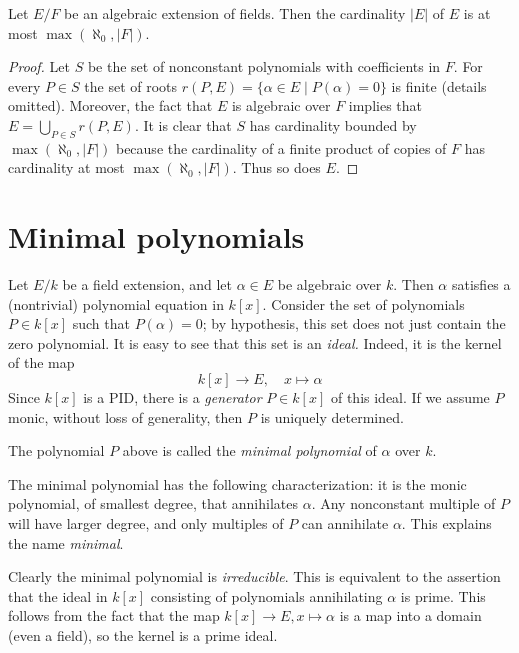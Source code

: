 \begin{lemma}
\label{lemma-size-algebraic-extension}
Let $E/F$ be an algebraic extension of fields. Then the cardinality $|E|$
of $E$ is at most $\max(\aleph_0, |F|)$.
\end{lemma}

\begin{proof}
Let $S$ be the set of nonconstant polynomials with coefficients in $F$.
For every $P \in S$ the set of roots
$r(P, E) = \{\alpha \in E \mid P(\alpha) = 0\}$
is finite (details omitted). Moreover, the fact that $E$ is algebraic
over $F$ implies that $E = \bigcup_{P \in S} r(P, E)$.
It is clear that $S$ has cardinality bounded by $\max(\aleph_0, |F|)$
because the cardinality of a finite product of copies of $F$ has
cardinality at most $\max(\aleph_0, |F|)$.
Thus so does $E$.
\end{proof}


\section{Minimal polynomials}
\label{section-minimal-polynomials}

\noindent
Let $E/k$ be a field extension, and let $\alpha \in E$ be algebraic over $k$.
Then $\alpha$ satisfies a (nontrivial) polynomial equation in $k[x]$.
Consider the set of polynomials $P \in k[x]$ such that $P(\alpha) = 0$; by
hypothesis, this set does not just contain the zero polynomial.
It is easy to see that this set is an {\it ideal.} Indeed, it is the kernel
of the map
$$
k[x] \to E, \quad x \mapsto \alpha
$$
Since $k[x]$ is a PID, there is a {\it generator} $P \in k[x]$ of this
ideal. If we assume $P$ monic, without loss of generality, then $P$ is
uniquely determined.

\begin{definition}
\label{definition-minimal-polynomial}
The polynomial $P$ above is called the {\it minimal polynomial}
of $\alpha$ over $k$.
\end{definition}

\noindent
The minimal polynomial has the following characterization: it is the monic
polynomial, of smallest degree, that annihilates $\alpha$. Any nonconstant
multiple of $P$ will have larger degree, and only multiples of $P$ can
annihilate $\alpha$. This explains the name {\it minimal}.

\medskip\noindent
Clearly the minimal polynomial is {\it irreducible}. This is equivalent to the
assertion that the ideal in $k[x]$ consisting of polynomials annihilating
$\alpha$ is prime. This follows from the fact that the map
$k[x] \to E, x \mapsto \alpha$ is a map into a domain (even a field), so the
kernel is a prime ideal.

